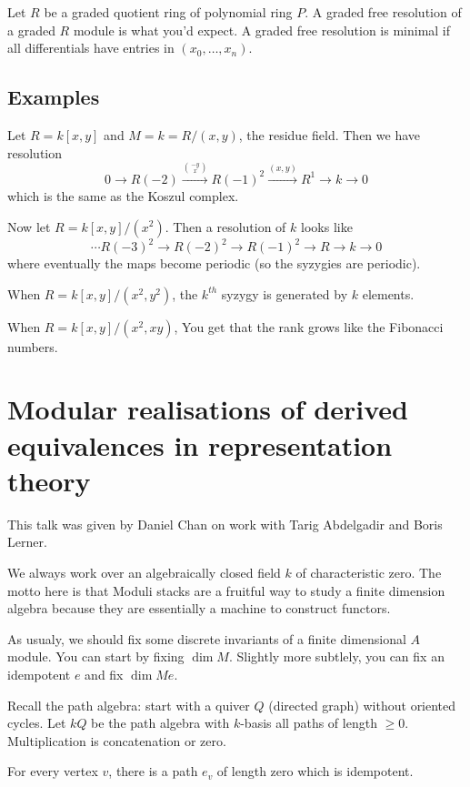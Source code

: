\documentclass[12pt]{article}
\begin{document}
Let $R$ be a graded quotient ring of polynomial ring $P$. A graded free resolution of a graded $R$ module is what you'd expect.
A graded free resolution is minimal if all differentials have entries in $(x_0,\dots,x_n)$.

\subsection{Examples}
\begin{ex}
	Let $R=k[x,y]$ and $M=k=R/(x,y)$, the residue field. Then we have resolution 
	\[0\to R(-2)\xrightarrow{\binom{-y}{x}} R(-1)^2\xrightarrow{(x,y)} R^1\to k\to 0\]
	which is the same as the Koszul complex.
\end{ex}
\begin{ex}
	Now let $R=k[x,y]/(x^2)$. Then a resolution of $k$ looks like 
	\[\cdots R(-3)^2\to R(-2)^2\to R(-1)^2\to R\to k\to 0\]
	where eventually the maps become periodic (so the syzygies are periodic).
\end{ex}
\begin{ex}
	When $R=k[x,y]/(x^2,y^2)$, the $k^{th}$ syzygy is generated by $k$ elements.
\end{ex}
\begin{ex}
	When $R=k[x,y]/(x^2,xy)$, You get that the rank grows like the Fibonacci numbers.
\end{ex}

\section{Modular realisations of derived equivalences in representation theory}
This talk was given by Daniel Chan on work with Tarig Abdelgadir and Boris Lerner.

We always work over an algebraically closed field $k$ of characteristic zero. The motto here is that Moduli stacks are a fruitful way to study a finite dimension algebra because 
they are essentially a machine to construct functors.

As usualy, we should fix some discrete invariants of a finite dimensional $A$ module. You can start by 
fixing $\dim M$. Slightly more subtlely, you can fix an idempotent $e$ and fix $\dim Me$.

Recall the path algebra: start with a quiver $Q$ (directed graph) without oriented cycles.
Let $kQ$ be the path algebra with $k$-basis all paths of length $\ge 0$. Multiplication is concatenation or zero.

For every vertex $v$, there is a path $e_v$ of length zero which is idempotent.
\end{document}
